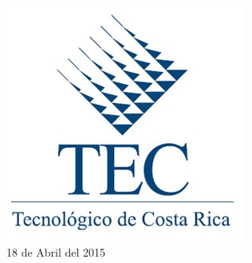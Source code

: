 \begin{titlepage}


\includegraphics[scale=0.5]{logo_tec.jpg}\\[2cm] %


{\large 18 de Abril del 2015}\\ %


\vfill %

\end{titlepage}